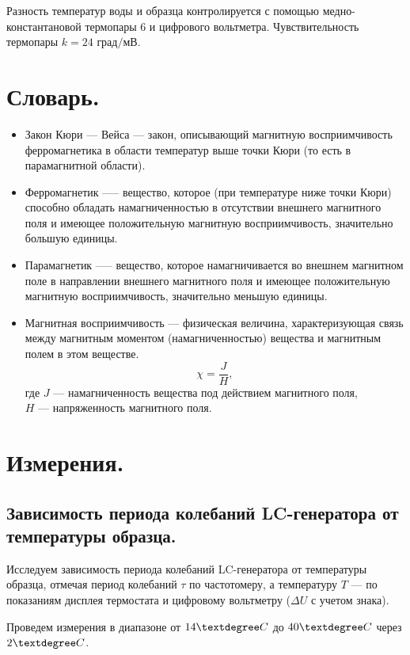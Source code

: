 \documentclass[12pt,a4paper]{article}
\begin{document}
        Разность температур воды и образца контролируется с помощью медно-константановой термопары 6 и цифрового вольтметра. Чувствительность термопары $k = 24 \text{ град/мВ}$.
        
\section{Словарь.}
    \begin{itemize}
        \item Закон Кюри — Вейса --- закон, описывающий магнитную восприимчивость ферромагнетика в области температур выше точки Кюри (то есть в парамагнитной области). 
     
        \item Ферромагнетик —-- вещество, которое (при температуре ниже точки Кюри) способно обладать намагниченностью в отсутствии внешнего магнитного поля и имеющее положительную магнитную восприимчивость, значительно большую единицы.
        
        \item Парамагнетик --— вещество, которое намагничивается во внешнем магнитном поле в направлении внешнего магнитного поля и имеющее положительную магнитную восприимчивость, значительно меньшую единицы. 
        \item Магнитная восприимчивость — физическая величина, характеризующая связь между магнитным моментом (намагниченностью) вещества и магнитным полем в этом веществе.
        \[
        \chi = \dfrac{J}{H},
        \]
        где $J$ --- намагниченность вещества под действием магнитного поля, \\ 
        $H$ --- напряженность магнитного поля.
    \end{itemize}
\newpage
\section{Измерения.}
    \subsection{Зависимость периода колебаний LC-генератора от температуры образца.}
        Исследуем зависимость периода колебаний LC-генератора от температуры образца, отмечая период колебаний $\tau$ по частотомеру, а температуру $T$ --- по показаниям дисплея термостата и цифровому вольтметру ($\Delta U$ с учетом знака).
        
        Проведем измерения в диапазоне от $14 \textdegree C$ до $40 \textdegree C$ через $2 \textdegree C$.
        
\end{document}

